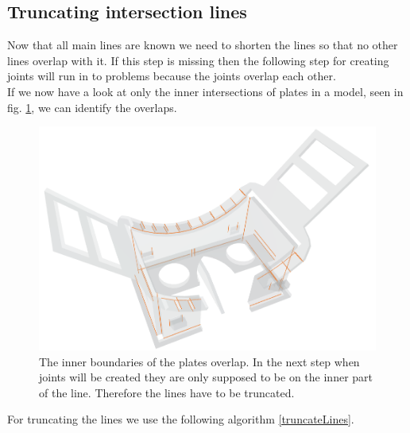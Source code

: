\documentclass[../ClassicThesis.tex]{subfiles}
\begin{document}
\subsection{Truncating intersection lines}
Now that all main lines are known we need to shorten the lines so that no other lines overlap with it. If this step is missing then the following step for creating joints will run in to problems because the joints overlap each other.\\
If we now have a look at only the inner intersections of plates in a model, seen in fig. \ref{fig:innerBoundaries}, we can identify the overlaps.
\begin{figure}[!ht]
\centering
\includegraphics[width=\columnwidth]{Images/TruncatedIntersectionsHMD.png}
\caption{The inner boundaries of the plates overlap. In the next step when joints will be created they are only supposed to be on the inner part of the line. Therefore the lines have to be truncated.}
\label{fig:innerBoundaries}
\end{figure}
For truncating the lines we use the following algorithm \ref{truncateLines}.
\\
\end{document}
